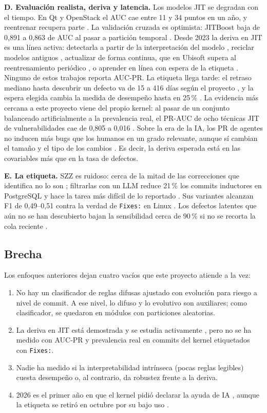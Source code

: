 \documentclass[conference,letterpaper]{IEEEtran}
\begin{document}
\textbf{D. Evaluación realista, deriva y latencia.} Los modelos JIT se degradan con el tiempo. En Qt y OpenStack el AUC cae entre 11 y 34 puntos en un año, y reentrenar recupera parte \cite{McIntosh2018}. La validación cruzada es optimista: JITBoost baja de 0,891 a 0,863 de AUC al pasar a partición temporal \cite{Shehab2023}. Desde 2023 la deriva en JIT es una línea activa: detectarla a partir de la interpretación del modelo \cite{Chitsazian2026}, reciclar modelos antiguos \cite{Patel2024}, actualizar de forma continua, que en Ubisoft supera al reentrenamiento periódico \cite{Olewicki2024}, o aprender en línea con espera de la etiqueta \cite{Tian2026}. Ninguno de estos trabajos reporta AUC-PR. La etiqueta llega tarde: el retraso mediano hasta descubrir un defecto va de 15 a 416 días según el proyecto \cite{Cabral2019}, y la espera elegida cambia la medida de desempeño hasta en 25\,\% \cite{Song2023}. La evidencia más cercana a este proyecto viene del propio kernel: al pasar de un conjunto balanceado artificialmente a la prevalencia real, el PR-AUC de ocho técnicas JIT de vulnerabilidades cae de 0,805 a 0,016 \cite{Nguyen2025}. Sobre la era de la IA, los PR de agentes no inducen más bugs que los humanos en un grado relevante, aunque sí cambian el tamaño y el tipo de los cambios \cite{Mazloomzadeh2026}. Es decir, la deriva esperada está en las covariables más que en la tasa de defectos.

\textbf{E. La etiqueta.} SZZ es ruidoso: cerca de la mitad de las correcciones que identifica no lo son \cite{Herbold2022}; filtrarlas con un LLM reduce 21\,\% los commits inductores en PostgreSQL y hace la tarea más difícil de lo reportado \cite{Veras2025}. Sus variantes alcanzan F1 de 0,49--0,51 contra la verdad de \texttt{Fixes:} en Linux \cite{Lyu2024}. Los defectos latentes que aún no se han descubierto bajan la sensibilidad cerca de 90\,\% si no se recorta la cola reciente \cite{Falessi2022}.
\subsection{Brecha}
Los enfoques anteriores dejan cuatro vacíos que este proyecto atiende a la vez:
\begin{enumerate}
\item No hay un clasificador de reglas difusas ajustado con evolución para riesgo a nivel de commit. A ese nivel, lo difuso y lo evolutivo son auxiliares; como clasificador, se quedaron en módulos con particiones aleatorias.
\item La deriva en JIT está demostrada y se estudia activamente \cite{McIntosh2018,Chitsazian2026,Patel2024}, pero no se ha medido con AUC-PR y prevalencia real en commits del kernel etiquetados con \texttt{Fixes:}.
\item Nadie ha medido si la interpretabilidad intrínseca (pocas reglas legibles) cuesta desempeño o, al contrario, da robustez frente a la deriva.
\item 2026 es el primer año en que el kernel pidió declarar la ayuda de IA \cite{KernelAdd}, aunque la etiqueta se retiró en octubre por su bajo uso \cite{KernelRemove}.
\end{enumerate}
\end{document}
